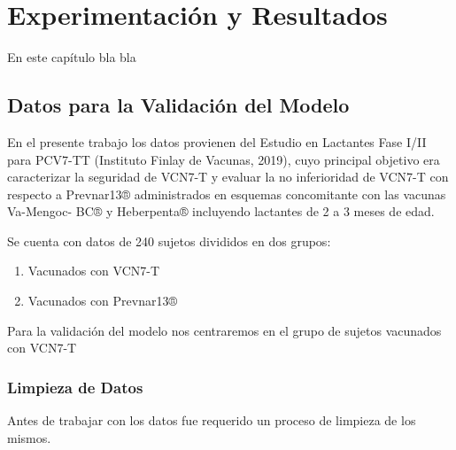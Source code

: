 \chapter{Experimentación y Resultados}\label{chapter:resultados}

En este capítulo bla bla

\section{Datos para la Validación del Modelo}
En el presente trabajo los datos provienen del Estudio en Lactantes Fase I/II para PCV7-TT (Instituto Finlay de Vacunas, 2019), cuyo principal objetivo era caracterizar la seguridad de VCN7-T y evaluar la no inferioridad de VCN7-T con respecto a Prevnar13® administrados en esquemas concomitante con las vacunas Va-Mengoc- BC® y Heberpenta® incluyendo lactantes de 2 a 3 meses de edad.

Se cuenta con datos de 240 sujetos divididos en dos grupos:
\begin{enumerate}
    \item Vacunados con VCN7-T
    \item Vacunados con Prevnar13®
\end{enumerate}

Para la validación del modelo nos centraremos en el grupo de sujetos vacunados con VCN7-T

\subsection{Limpieza de Datos}
Antes de trabajar con los datos fue requerido un proceso de limpieza de los mismos. 



